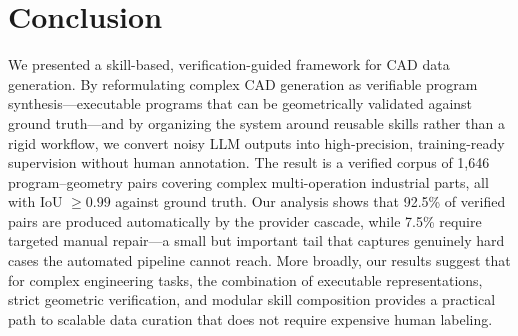 \section{Conclusion}
\label{sec:conclusion}

We presented a skill-based, verification-guided framework for CAD data generation.
By reformulating complex CAD generation as verifiable program synthesis---executable programs that can be geometrically validated against ground truth---and by organizing the system around reusable skills rather than a rigid workflow, we convert noisy LLM outputs into high-precision, training-ready supervision without human annotation.
The result is a verified corpus of 1,646 program--geometry pairs covering complex multi-operation industrial parts, all with IoU $\geq 0.99$ against ground truth.
Our analysis shows that 92.5\% of verified pairs are produced automatically by the provider cascade, while 7.5\% require targeted manual repair---a small but important tail that captures genuinely hard cases the automated pipeline cannot reach.
More broadly, our results suggest that for complex engineering tasks, the combination of executable representations, strict geometric verification, and modular skill composition provides a practical path to scalable data curation that does not require expensive human labeling.

